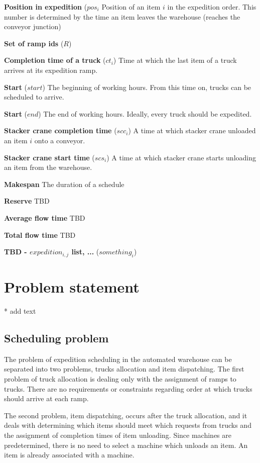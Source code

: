 \documentclass{ctuthesis}
\begin{document}
\noindent \textbf{Position in expedition} ($pos_i$ Position of an item $i$ in the expedition order. This number is determined by the time an item leaves the warehouse (reaches the conveyor junction)

\noindent \textbf{Set of ramp ids} ($R$) 

\noindent \textbf{Completion time of a truck} ($ct_i$) Time at which the last item of a truck arrives at its expedition ramp.

\noindent \textbf{Start} ($start$) The beginning of working hours. From this time on, trucks can be scheduled to arrive.

\noindent \textbf{Start} ($end$) The end of working hours. Ideally, every truck should be expedited.

\noindent \textbf{Stacker crane completion time} ($scc_i$) A time at which stacker crane unloaded an item $i$ onto a conveyor.

\noindent \textbf{Stacker crane start time} ($scs_i$) A time at which stacker crane starts unloading an item from the warehouse.

\noindent \textbf{Makespan} The duration of a schedule

\noindent \textbf{Reserve} TBD

\noindent \textbf{Average flow time} TBD

\noindent \textbf{Total flow time} TBD

\noindent \textbf{TBD - $expedition_{i,j}$ list, ... } ($something_i$)

\chapter{Problem statement}

* add text
\section{Scheduling problem}
 
 The problem of expedition scheduling in the automated warehouse can be separated into two problems, trucks allocation and item dispatching. The first problem of truck allocation is dealing only with the assignment of ramps to trucks. There are no requirements or constraints regarding order at which trucks should arrive at each ramp.
 
 The second problem, item dispatching, occurs after the truck allocation, and it deals with determining which items should meet which requests from trucks and the assignment of completion times of item unloading. Since machines are predetermined, there is no need to select a machine which unloads an item. An item is already associated with a machine.
 
\end{document}
